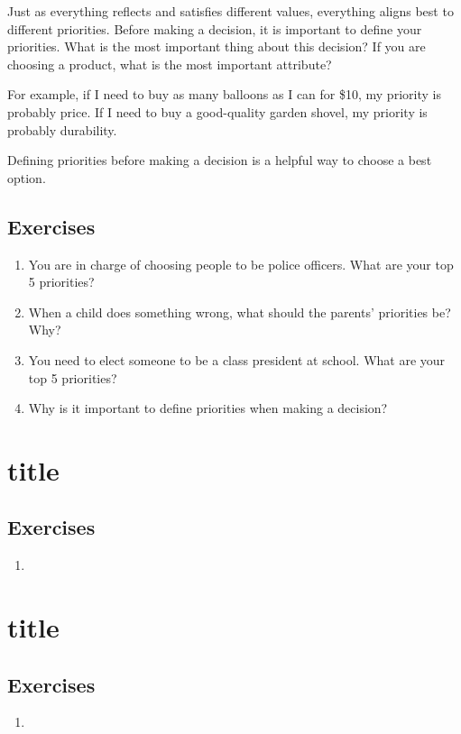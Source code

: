 Just as everything reflects and satisfies different values, everything aligns best to different priorities. Before making a decision, it is important to define your priorities. What is the most important thing about this decision? If you are choosing a product, what is the most important attribute? 

For example, if I need to buy as many balloons as I can for \$10, my priority is probably price. If I need to buy a good-quality garden shovel, my priority is probably durability.

Defining priorities before making a decision is a helpful way to choose a best option.

\section*{ Exercises}

\begin{enumerate}
	\item You are in charge of choosing people to be police officers. What are your top 5 priorities?
	\item When a child does something wrong, what should the parents' priorities be? Why?
	\item You need to elect someone to be a class president at school. What are your top 5 priorities?
	\item Why is it important to define priorities when making a decision?
\end{enumerate}


\chapter{title}



\section*{ Exercises}

\begin{enumerate}
	\item 
\end{enumerate}


\chapter{title}



\section*{ Exercises}

\begin{enumerate}
	\item 
\end{enumerate}